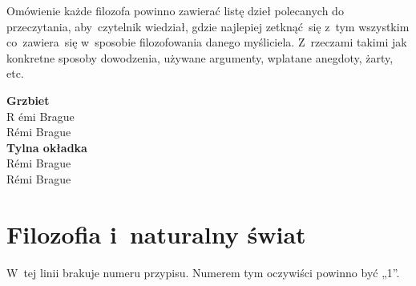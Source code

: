 \documentclass[a4paper,11pt]{article}
\begin{document}
\noindent
Omówienie każde filozofa powinno zawierać listę dzieł
polecanych do przeczytania, aby~czytelnik wiedział, gdzie najlepiej
zetknąć~się z~tym wszystkim co~zawiera~się w~sposobie filozofowania
danego myśliciela. Z~rzeczami takimi jak konkretne sposoby dowodzenia,
używane argumenty, wplatane anegdoty, żarty, etc.









\vspace{\spaceTwo}


\noindent
\textbf{Grzbiet} \\
\Jest  R \'{e}mi {\small Brague} \\
\Powin R\'{e}mi Brague \\
\textbf{Tylna okładka} \\
\Jest  R\'{e}mi {\small Brague} \\
\Powin R\'{e}mi Brague \\












\newpage

\section{Filozofia i~naturalny świat}

\vspace{\spaceTwo}




\vspace{0em}



\vspace{0em}


\noindent
{} W~tej linii brakuje numeru przypisu. Numerem tym oczywiści
powinno być „1”.

\vspace{\spaceFour}
\end{document}
